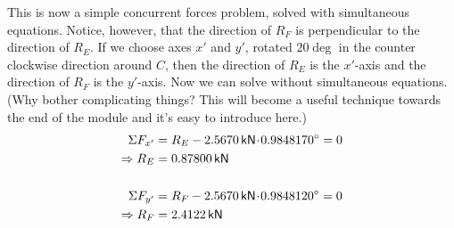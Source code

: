 \documentclass[10pt,oneside]{article}
\begin{document}
\begin{textblock*}{6.75in}
{        This is now a simple concurrent forces problem, solved with simultaneous equations. Notice, however, that the direction of $R_F$ is perpendicular to the direction of $R_E$. \parb 
        If we choose axes $x'$ and $y'$, rotated $20\deg$ in the counter clockwise direction around $C$, then the direction of $R_E$ is the $x'$-axis and the direction of $R_F$ is the $y'$-axis. Now we can solve without simultaneous equations.\parb
        (Why bother complicating things? This will become a useful technique towards the end of the module and it's easy to introduce here.)
        \begin{align*}
          \Sigma F_{x'} &= R_E-2.5670\,\mathsf{kN}\!\cdot\!0.98481 70^\circ =0 \\
          \Rightarrow R_E &= 0.87800\,\mathsf{kN}\\\\
          \Sigma F_{y'} &= R_F-2.5670\,\mathsf{kN}\!\cdot\!0.98481 20^\circ =0 \\
          \Rightarrow R_F &= 2.4122\,\mathsf{kN}\\
        \end{align*}
        \vspace{-1cm}
      
    }
    \end{textblock*}

~\newpage
\end{document}

